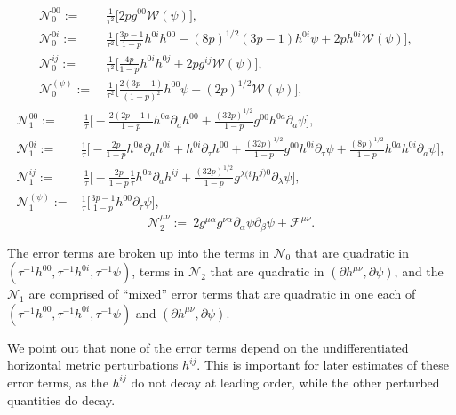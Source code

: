 \documentclass{article}
\newcommand{\mc}{\mathcal}
\newcommand{\pa}{\partial}
\begin{document}
\begin{subequations}
    \begin{align}
        \mc{N}_0^{00} :=&\>\frac{1}{\tau^2}\Big[2pg^{00}\mc{W}(\psi)\Big],\\
        \mc{N}_0^{0i} :=&\>\frac{1}{\tau^2}\Big[\frac{3p-1}{1-p}h^{0i}h^{00} - (8p)^{1/2}(3p-1)h^{0i}\psi + 2ph^{0i}\mc{W}(\psi)\Big],\\
        \mc{N}_0^{ij} := &\>\frac{1}{\tau^2}\Big[\frac{4p}{1-p}h^{0i}h^{0j} + 2pg^{ij}\mc{W}(\psi)\Big],&\\
        \mc{N}_0^{(\psi)} := &\>\frac{1}{\tau^2}\Big[\frac{2(3p-1)}{(1-p)^2}h^{00}\psi-(2p)^{1/2}\mc{W}(\psi)\Big],
        \end{align}
    \end{subequations}
\begin{subequations}
    \begin{align}
        \mc{N}_1^{00} :=&\> \frac{1}{\tau}\Big[-\frac{2(2p-1)}{1-p}h^{0a}\pa_a h^{00} + \frac{(32p)^{1/2}}{1-p}g^{00}h^{0a}\pa_a\psi\Big],\\
        \mc{N}_1^{0i} := &\frac{1}{\tau}\Big[-\frac{2p}{1-p}h^{0a}\pa_a h^{0i} + h^{0i}\pa_\tau h^{00} + \frac{(32p)^{1/2}}{1-p}g^{00}h^{0i}\pa_\tau \psi +\frac{(8p)^{1/2}}{1-p}h^{0a}h^{0i}\pa_a \psi\Big],\\
        \mc{N}_1^{ij} := &\>\frac{1}{\tau}\Big[-\frac{2p}{1-p}\frac{1}{\tau}h^{0a}\pa_a h^{ij} + \frac{(32p)^{1/2}}{1-p}g^{\lambda(i}h^{j)0}\pa_\lambda \psi\Big],\\
        \mc{N}_1^{(\psi)} :=& \frac{1}{\tau} \Big[\frac{3p-1}{1-p}h^{00}\pa_\tau \psi\Big],
    \end{align}
\end{subequations}
\begin{equation}
    \mc{N}_2^{\mu\nu} := \>2g^{\mu\alpha}g^{\nu\alpha}\pa_\alpha\psi\pa_\beta \psi + \mc{F}^{\mu\nu}.
\end{equation}
\begin{remark}
    The error terms are broken up into the terms in $\mc{N}_0$ that are quadratic in $(\tau^{-1}h^{00},\tau^{-1}h^{0i},\tau^{-1}\psi)$, terms in $\mc{N}_2$ that are quadratic in $(\pa h^{\mu\nu},\pa \psi)$, and the $\mc{N}_1$ are comprised of ``mixed'' error terms that are quadratic in one each of $(\tau^{-1}h^{00},\tau^{-1}h^{0i},\tau^{-1}\psi)$ and $(\pa h^{\mu\nu},\pa \psi)$. 
    
    We point out that none of the error terms depend on the undifferentiated horizontal metric perturbations $h^{ij}$. This is important for later estimates of these error terms, as the $h^{ij}$ do not decay at leading order, while the other perturbed quantities do decay.
\end{remark}
\end{document}
